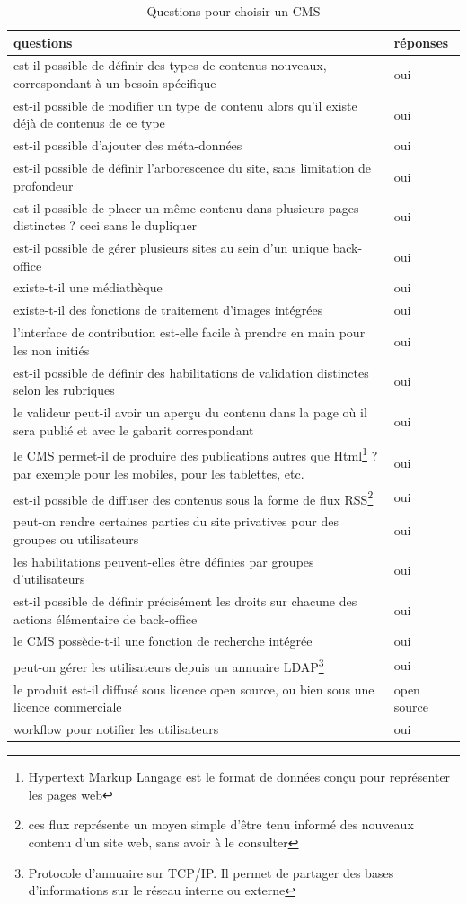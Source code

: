 \begin{table}[h]
\centering
\begin{tabular}{|p{10cm}|m{2cm}|}
\hline questions & réponses \tabularnewline
\hline est-il possible de définir des types de contenus nouveaux, correspondant à un besoin spécifique & oui \tabularnewline
\hline est-il possible de modifier un type de contenu alors qu'il existe déjà de contenus de ce type & oui \tabularnewline
\hline est-il possible d'ajouter des méta-données & oui \tabularnewline
\hline est-il possible de définir l'arborescence du site, sans limitation de profondeur & oui \tabularnewline
\hline est-il possible de placer un même contenu dans plusieurs pages distinctes ? ceci sans le dupliquer & oui \tabularnewline
\hline est-il possible de gérer plusieurs sites au sein d'un unique back-office & oui \tabularnewline

\hline existe-t-il une médiathèque & oui \tabularnewline
\hline existe-t-il des fonctions de traitement d'images intégrées & oui \tabularnewline
\hline l'interface de contribution est-elle facile à prendre en main pour les non initiés & oui \tabularnewline
\hline est-il possible de définir des habilitations de validation distinctes selon les rubriques & oui \tabularnewline
\hline le valideur peut-il avoir un aperçu du contenu dans la page où il sera publié et avec le gabarit correspondant & oui \tabularnewline
\hline le CMS permet-il de produire des publications autres que Html\footnote{Hypertext Markup Langage est le format de données conçu pour représenter les pages web} ? par exemple pour les mobiles, pour les tablettes, etc. & oui \tabularnewline
\hline est-il possible de diffuser des contenus sous la forme de flux RSS\footnote{ces flux représente un moyen simple d'être tenu informé des nouveaux contenu d'un site web, sans avoir à le consulter\cite{ccm}} & oui \tabularnewline
\hline peut-on rendre certaines parties du site privatives pour des groupes ou utilisateurs & oui \tabularnewline
\hline les habilitations peuvent-elles être définies par groupes d'utilisateurs & oui \tabularnewline
\hline est-il possible de définir précisément les droits sur chacune des actions élémentaire de back-office & oui \tabularnewline
\hline le CMS possède-t-il une fonction de recherche intégrée & oui \tabularnewline
\hline peut-on gérer les utilisateurs depuis un annuaire LDAP\footnote{Protocole d'annuaire sur TCP/IP. Il permet de partager des bases d'informations sur le réseau interne ou externe\cite{ldap}} & oui \tabularnewline
\hline le produit est-il diffusé sous licence open source, ou bien sous une licence commerciale & open source \tabularnewline
\hline workflow pour notifier les utilisateurs & oui \tabularnewline
\hline
\end{tabular}

\caption{\label{questionsChoix}Questions pour choisir un CMS}
\end{table}
\clearpage


